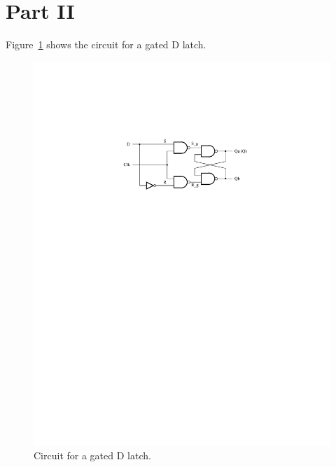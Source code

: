 \documentclass[epsfig,10pt,fullpage]{article}
\begin{document}
\section*{Part II}
Figure~\ref{fig:gatedD} shows the circuit for a gated D latch.
\begin{figure}[H]
	\begin{center}
		\includegraphics[]{figures/D_latch.pdf}
	\end{center}
	\caption{Circuit for a gated D latch.}
\label{fig:gatedD}
\end{figure}
\end{document}
